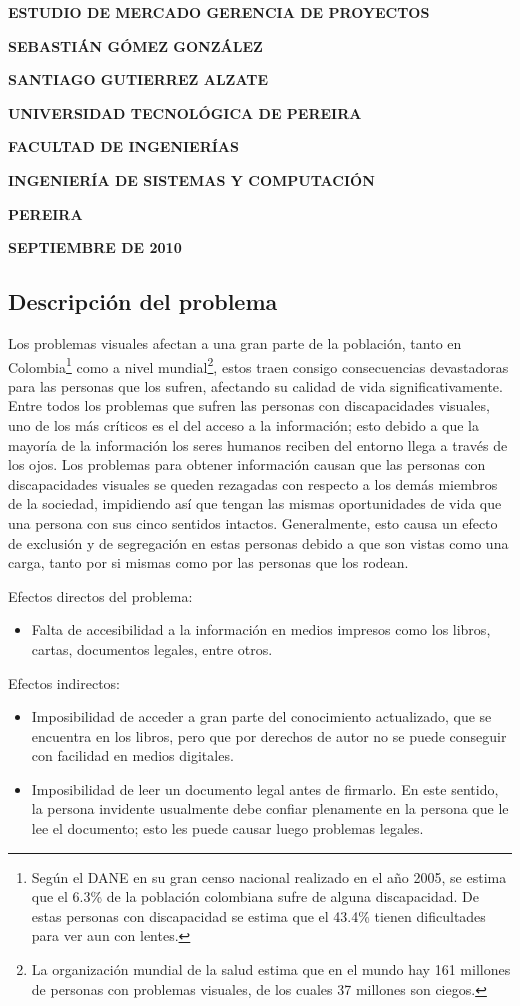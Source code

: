 \documentclass[a4paper, 12pt, oneside]{article}
\newcommand\portada{
	\begin{titlepage}
		\begin{center}
			{\large \bf ESTUDIO DE MERCADO GERENCIA DE PROYECTOS}
			\vfill
			{\large\bf SEBASTIÁN GÓMEZ GONZÁLEZ \par}
			{\large\bf SANTIAGO GUTIERREZ ALZATE \par}
			\vfill
			{\large\bf UNIVERSIDAD TECNOLÓGICA DE PEREIRA  \par}
			{\large\bf FACULTAD DE INGENIERÍAS \par}
			{\large\bf INGENIERÍA DE SISTEMAS Y COMPUTACIÓN \par}
			{\large\bf PEREIRA\par}
			{\large\bf SEPTIEMBRE DE 2010 \par}
		\end{center}
	\end{titlepage}
}
\begin{document}
\portada

	
	\begin{center}
	\section{Descripción del problema}
	\end{center}

	Los problemas visuales afectan a una gran parte de la población, tanto en Colombia\footnote{Según el DANE en su gran censo nacional realizado en el año 2005, se estima que el 6.3\% de la población colombiana sufre de alguna discapacidad. De estas personas con discapacidad se estima que el 43.4\% tienen dificultades para ver aun con lentes.} como a nivel mundial\footnote{La organización mundial de la salud estima que en el mundo hay 161 millones de personas con problemas visuales, de los cuales 37 millones son ciegos.}, estos traen consigo consecuencias devastadoras para las personas que los sufren, afectando su calidad de vida significativamente. Entre todos los problemas que sufren las personas con discapacidades visuales, uno de los más críticos es el del acceso a la información; esto debido a que la mayoría de la información los seres humanos reciben del entorno llega a través de los ojos. Los problemas para obtener información causan que las personas con discapacidades visuales se queden rezagadas con respecto a los demás miembros de la sociedad, impidiendo así que tengan las mismas oportunidades de vida que una persona con sus cinco sentidos intactos. Generalmente, esto causa un efecto de exclusión y de segregación en estas personas debido a que son vistas como una carga, tanto por si mismas como por las personas que los rodean. 


	Efectos directos del problema:
	\begin{itemize}
	\item Falta de accesibilidad a la información en medios impresos como los libros, cartas, documentos legales, entre otros.
	\end{itemize}

	Efectos indirectos:
	\begin{itemize}
	\item Imposibilidad de acceder a gran parte del conocimiento actualizado, que se encuentra en los libros, pero que por derechos de autor no se puede conseguir con facilidad en medios digitales.
	\item Imposibilidad de leer un documento legal antes de firmarlo. En este sentido, la persona invidente usualmente debe confiar plenamente en la persona que le lee el documento; esto les puede causar luego problemas legales.
	\end{itemize}
	
\end{document}
